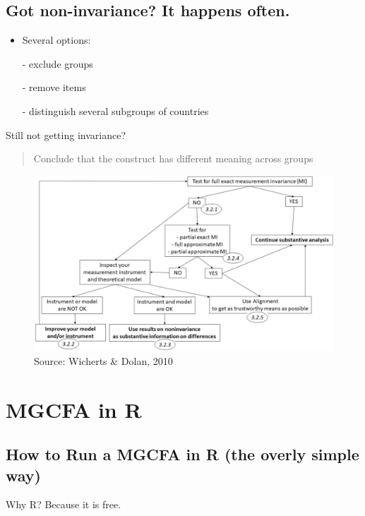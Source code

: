 \documentclass[
]{book}
\begin{document}
\hypertarget{got-non-invariance-it-happens-often.}{%
\subsection{Got non-invariance? It happens often.}\label{got-non-invariance-it-happens-often.}}

\begin{itemize}
\item
  Several options:

  - exclude groups

  - remove items

  - distinguish several subgroups of countries
\end{itemize}

Still not getting invariance?

\begin{quote}
Conclude that the construct has different meaning across groups
\end{quote}

\begin{figure}
\includegraphics[width=0.8\linewidth]{decision_tree} \caption{Source: Wicherts & Dolan, 2010}\label{fig:tree}
\end{figure}

\hypertarget{mgcfa-in-r}{%
\section{MGCFA in R}\label{mgcfa-in-r}}

\hypertarget{how-to-run-a-mgcfa-in-r-the-overly-simple-way}{%
\subsection{How to Run a MGCFA in R (the overly simple way)}\label{how-to-run-a-mgcfa-in-r-the-overly-simple-way}}

Why R? Because it is free.
\end{document}
